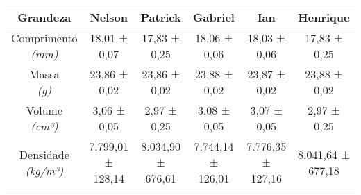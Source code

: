 \documentclass{article}
\begin{document}
\begin{table}[h!]
\centering
\begin{tabular}{c c c c c c }
\toprule
Grandeza & Nelson & Patrick & Gabriel & Ian & Henrique\\
\midrule
\shortstack{Comprimento\\\textit{(mm)}} & 18,01 ± 0,07 & 17,83 ± 0,25 & 18,06 ± 0,06 & 18,03 ± 0,06 & 17,83 ± 0,25\\[4pt]
\shortstack{Massa\\\textit{(g)}} & 23,86 ± 0,02 & 23,86 ± 0,02 & 23,88 ± 0,02 & 23,87 ± 0,02 & 23,88 ± 0,02\\[4pt]
\shortstack{Volume\\\textit{(cm³)}} & 3,06 ± 0,05 & 2,97 ± 0,25 & 3,08 ± 0,05 & 3,07 ± 0,05 & 2,97 ± 0,25\\[4pt]
\shortstack{Densidade\\\textit{(kg/m³)}} & 7.799,01 ± 128,14 & 8.034,90 ± 676,61 & 7.744,14 ± 126,01 & 7.776,35 ± 127,16 & 8.041,64 ± 677,18\\[4pt]
\bottomrule
\end{tabular}
\end{table}
\end{document}
